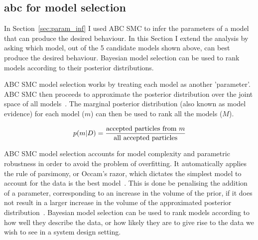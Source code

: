 \subsection{\acrshort{abc} for model selection}

In Section~\ref{sec:param_inf} I used ABC SMC to infer the parameters of a model that can produce the desired behaviour. In this Section I extend the analysis by asking which model, out of the 5 candidate models shown above, can best produce the desired behaviour. Bayesian model selection can be used to rank models according to their posterior distributions. 

ABC SMC model selection works by treating each model as another 'parameter'. ABC SMC then proceeds to approximate the posterior distribution over the joint space of all models~\autocite{Toni:2009tr}. The marginal posterior distribution (also known as model evidence) for each model ($m$) can then be used to rank all the models ($M$). 

\begin{align}
	p(m|D) = \frac{\textnormal{accepted particles from } m}{\textnormal{all accepted particles}}
\end{align}

ABC SMC model selection accounts for model complexity and parametric robustness in order to avoid the problem of overfitting. It automatically applies the rule of parsimony, or Occam's razor, which dictates the simplest model to account for the data is the best model~\autocite{Toni:2010}. This is done be penalising the addition of a parameter, corresponding to an increase in the volume of the prior,  if it does not result in a larger increase in the volume of the approximated posterior distribution~\autocite{Woods:2016eh}.  Bayesian model selection can be used to rank models according to how well they describe the data, or how likely they are to give rise to the data we wish to see in a system design setting.  


    
